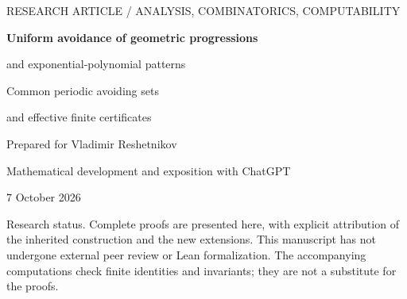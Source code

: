 \documentclass[11pt,a4paper]{article}
\theoremstyle{plain}
\theoremstyle{definition}
\theoremstyle{remark}
\newcommand{\R}{\mathbb R}\newcommand{\N}{\mathbb N}\newcommand{\Z}{\mathbb Z}
\begin{document}
\hypersetup{pageanchor=false}
\begin{titlepage}
\raggedright
\vspace*{12mm}
{\sffamily\small\color{teal}RESEARCH ARTICLE \quad / \quad ANALYSIS, COMBINATORICS, COMPUTABILITY}\par
\vspace{12mm}
{\Huge\bfseries\color{ink}Uniform avoidance of geometric progressions\par}
\vspace{5mm}
{\LARGE\color{ink}and exponential-polynomial patterns\par}
\vspace{9mm}
{\large Common periodic avoiding sets\par
and effective finite certificates}\par
\vspace{13mm}
{\large Prepared for Vladimir Reshetnikov}\par
{\color{muted}Mathematical development and exposition with ChatGPT}\par
{\color{muted}7 October 2026}\par
\vspace{10mm}
\begin{abstract}
We prove that, for every $\eps>0$, there is a closed, symmetric, $1$-periodic set
$F\subset\R$ whose measure in every interval of length one exceeds $1-\eps$
and which contains no affine copy of $\{q^n:n\ge1\}$ for \emph{any}
$q\in(0,1)$. Its compact section answers negatively Question~1 of
Burgin--Goldberg--Keleti--MacMahon--Wang. The construction extends the
fixed-ratio routing method in the October 2026 OpenAI manuscript by
synchronizing a ratio-dependent subsequence to common spatial grids.
An elementary arrangement of lines bounds the number of parameter tests,
including boundary cases. A polynomial-family version, using the classical
bound for realizable polynomial sign conditions, yields one common avoiding
set for every finite positive exponential mixture
$\sum_{i=1}^m c_iq_i^n$, with unrestricted finite $m$, positive bases below
one, and nonnegative coefficients not all zero. A uniform dominant-term
reduction also covers arbitrary real polynomial coefficients with positive
real bases, and hence all nonzero real solutions of homogeneous
constant-coefficient recurrences whose characteristic roots lie in $(0,1)$.
For rational accuracy the
compact set can be effectively closed with computable Lebesgue measure.
Finite avoidance statements on rational compact parameter boxes have
algorithmically obtainable rational certificates and positive margins.
The probability argument is given in full; exact finite checks accompany
the article. The similarity conjecture for arbitrary infinite patterns remains
outside the conclusions of this paper.
\end{abstract}
\vfill
{\small\color{muted}Research status. Complete proofs are presented here, with explicit attribution
of the inherited construction and the new extensions. This manuscript has
not undergone external peer review or Lean formalization. The accompanying
computations check finite identities and invariants; they are not a substitute
for the proofs.}
\end{titlepage}
\end{document}
